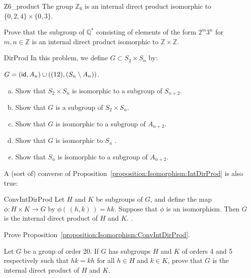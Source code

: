  
\begin{example}{Z6_product}
The group ${\mathbb Z}_6$ is an internal direct product isomorphic to $\{
0, 2, 4\} \times \{ 0, 3 \}$. 
\end{example}

\begin{exercise}{}
Prove that the subgroup of ${\mathbb Q}^\ast$ consisting of elements of
the form $2^m 3^n$ for $m,n \in {\mathbb Z}$ is an internal direct
product isomorphic to ${\mathbb Z} \times {\mathbb Z}$.
 \end{exercise}

\begin{exercise}{DirProd}
In this problem, we define  $G \subset S_2  \times S_n$ by:
\noindent

$G = ({\sf{i}d} , A_n) \cup ( (12) , (S_n \setminus  A_n))$.
\begin{enumerate}[(a)]
\item
Show that $S_2  \times S_n $ is isomorphic to a subgroup of $S_{n+2}$.  
\item
 Show that $G$  is  a subgroup of $S_2  \times S_n $.
\item
Show that $G$ is isomorphic to a subgroup of $A_{n+2}$.
\item
Show that $G$ is isomorphic to $S_n$ .
\item
Show that $S_n$ is isomorphic to a subgroup of $A_{n+2}$.  
\end{enumerate}
\end{exercise}

A (sort of) converse of Proposition~\ref{proposition:Isomorphism:IntDirProd} is also true:

\begin{prop}{ConvIntDirProd}
Let $H$ and $K$ be subgroups of $G$, and define the map $\phi:H \times K \rightarrow G$  by $\phi(\, (h,k)\,) = hk$.  Suppose that $\phi$ is an isomorphism.  Then $G$ is the internal direct product of  $H$ and $K$.
.\end{prop}

\begin{exercise}{}
Prove Proposition~\ref{proposition:Isomorphism:ConvIntDirProd}.
\end{exercise}

\begin{exercise}{}
Let $G$ be a group of order 20. If $G$ has subgroups $H$ and $K$ of
orders 4 and 5 respectively such that $hk = kh$ for all $h \in H$ and
$k \in K$, prove that $G$ is the internal direct product of $H$ and $K$. 
 \end{exercise}

